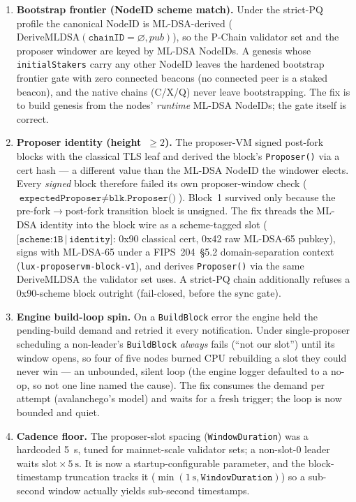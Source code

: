 \begin{enumerate}[leftmargin=1.4em,nosep]
\item \textbf{Bootstrap frontier (NodeID scheme match).} Under the
  strict-PQ profile the canonical NodeID is ML-DSA-derived
  ($\mathrm{DeriveMLDSA}(\texttt{chainID}{=}\varnothing, \mathit{pub})$),
  so the P-Chain validator set and the proposer windower are keyed by
  ML-DSA NodeIDs. A genesis whose \texttt{initialStakers} carry any
  other NodeID leaves the hardened bootstrap frontier gate with zero
  connected beacons (no connected peer is a staked beacon), and the
  native chains (C/X/Q) never leave bootstrapping. The fix is to build
  genesis from the nodes' \emph{runtime} ML-DSA NodeIDs; the gate itself
  is correct.
\item \textbf{Proposer identity (height~$\ge 2$).} The proposer-VM signed
  post-fork blocks with the classical TLS leaf and derived the block's
  \texttt{Proposer()} via a cert hash --- a different value than the
  ML-DSA NodeID the windower elects. Every \emph{signed} block therefore
  failed its own proposer-window check
  ($\texttt{expectedProposer} \ne \texttt{blk.Proposer()}$). Block~1
  survived only because the pre-fork$\to$post-fork transition block is
  unsigned. The fix threads the ML-DSA identity into the block wire as a
  scheme-tagged slot ($\texttt{[scheme:1B}\,|\,\texttt{identity]}$: 0x90
  classical cert, 0x42 raw ML-DSA-65 pubkey), signs with ML-DSA-65 under
  a FIPS~204~\S5.2 domain-separation context
  (\texttt{lux-proposervm-block-v1}), and derives \texttt{Proposer()} via
  the same $\mathrm{DeriveMLDSA}$ the validator set uses. A strict-PQ
  chain additionally refuses a 0x90-scheme block outright (fail-closed,
  before the sync gate).
\item \textbf{Engine build-loop spin.} On a \texttt{BuildBlock} error the
  engine held the pending-build demand and retried it every
  notification. Under single-proposer scheduling a non-leader's
  \texttt{BuildBlock} \emph{always} fails (``not our slot'') until its
  window opens, so four of five nodes burned CPU rebuilding a slot they
  could never win --- an unbounded, silent loop (the engine logger
  defaulted to a no-op, so not one line named the cause). The fix
  consumes the demand per attempt (avalanchego's model) and waits for a
  fresh trigger; the loop is now bounded and quiet.
\item \textbf{Cadence floor.} The proposer-slot spacing
  (\texttt{WindowDuration}) was a hardcoded \SI{5}{\second}, tuned for
  mainnet-scale validator sets; a non-slot-0 leader waits
  $\mathrm{slot}\times\SI{5}{\second}$. It is now a startup-configurable
  parameter, and the block-timestamp truncation tracks it
  ($\min(\SI{1}{\second}, \texttt{WindowDuration})$) so a sub-second
  window actually yields sub-second timestamps.
\end{enumerate}

